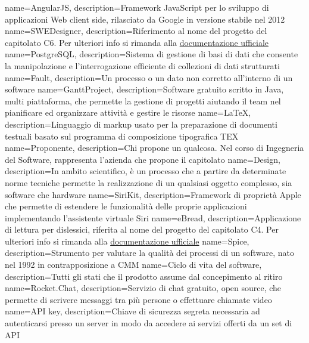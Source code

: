  {
	name=AngularJS,
	description={Framework JavaScript per lo sviluppo di applicazioni Web client side, rilasciato da Google in versione stabile nel 2012}
}
 {
	name=SWEDesigner,
	description={Riferimento al nome del progetto del capitolato C6. Per ulteriori info si rimanda alla \href{http://www.math.unipd.it/~tullio/IS-1/2016/Progetto/C6.pdf}{documentazione ufficiale}}
}
 {
	name=PostgreSQL,
	description={Sistema di gestione di basi di dati che consente la manipolazione e l'interrogazione efficiente di collezioni di dati strutturati}
}
 {
	name=Fault,
	description={Un processo o un dato non corretto all'interno di un software}
}
 {
	name=GanttProject,
	description={Software gratuito scritto in Java, multi piattaforma, che permette la gestione di progetti aiutando il team nel pianificare ed organizzare attività e gestire le risorse}
}
 {
	name=LaTeX,
	description={Linguaggio di markup usato per la preparazione di documenti testuali basato sul programma di composizione tipografica TEX}
}
 {
	name=Proponente,
	description={Chi propone un qualcosa. Nel corso di Ingegneria del Software, rappresenta l'azienda che propone il capitolato}
}
 {
	name=Design,
	description={In ambito scientifico, è un processo che a partire da determinate norme tecniche permette la realizzazione di un qualsiasi oggetto complesso, sia software che hardware}
}
 {
	name=SiriKit,
	description={Framework di proprietà Apple che permette di estendere le funzionalità delle proprie applicazioni implementando l'assistente virtuale Siri}
}
 {
	name=eBread,
	description={Applicazione di lettura per dislessici, riferita al nome del progetto del capitolato C4. Per ulteriori info si rimanda alla \href{http://www.math.unipd.it/~tullio/IS-1/2016/Progetto/C4.pdf}{documentazione ufficiale}}
}
 {
	name=Spice,
	description={Strumento per valutare la qualità dei processi di un software, nato nel 1992 in contrapposizione a CMM}
}
 {
	name=Ciclo di vita del software,
	description={Tutti gli stati che il prodotto assume dal concepimento al ritiro}
}
 {
	name=Rocket.Chat,
	description={Servizio di chat gratuito, open source, che permette di scrivere messaggi tra più persone o effettuare chiamate video}
}
 {
	name=API key,
	description={Chiave di sicurezza segreta necessaria ad autenticarsi presso un server in modo da accedere ai servizi offerti da un set di API}
}
